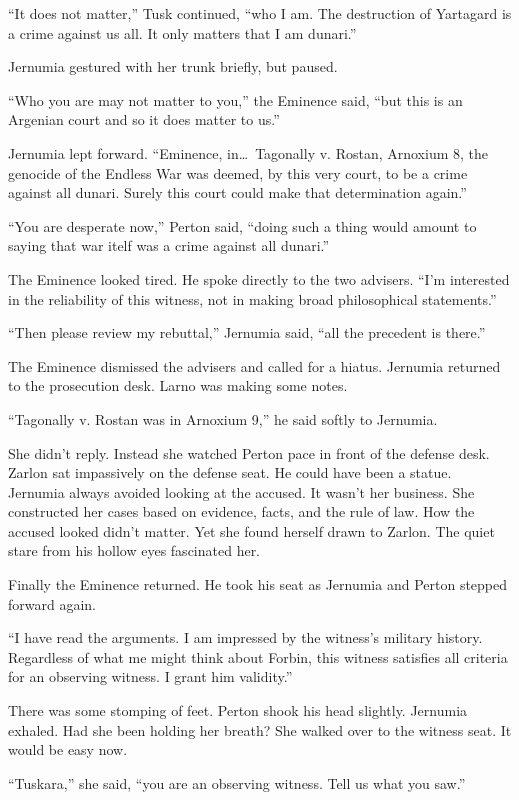 ``It does not matter,'' Tusk continued, ``who I am. The destruction of Yartagard is a crime
against us all. It only matters that I am dunari.''

Jernumia gestured with her trunk briefly, but paused.

``Who you are may not matter to you,'' the Eminence said, ``but this is an Argenian court and so
it does matter to us.''

Jernumia lept forward. ``Eminence, in\ldots\ Tagonally v. Rostan, Arnoxium 8, the genocide of
the Endless War was deemed, by this very court, to be a crime against all dunari. Surely this
court could make that determination again.''

``You are desperate now,'' Perton said, ``doing such a thing would amount to saying that war
itelf was a crime against all dunari.''

The Eminence looked tired. He spoke directly to the two advisers. ``I'm interested in the
reliability of this witness, not in making broad philosophical statements.''

``Then please review my rebuttal,'' Jernumia said, ``all the precedent is there.''

The Eminence dismissed the advisers and called for a hiatus. Jernumia returned to the
prosecution desk. Larno was making some notes.

``Tagonally v. Rostan was in Arnoxium 9,'' he said softly to Jernumia.

She didn't reply. Instead she watched Perton pace in front of the defense desk. Zarlon sat
impassively on the defense seat. He could have been a statue. Jernumia always avoided looking at
the accused. It wasn't her business. She constructed her cases based on evidence, facts, and the
rule of law. How the accused looked didn't matter. Yet she found herself drawn to Zarlon. The
quiet stare from his hollow eyes fascinated her.

Finally the Eminence returned. He took his seat as Jernumia and Perton stepped forward again.

``I have read the arguments. I am impressed by the witness's military history. Regardless of
what me might think about Forbin, this witness satisfies all criteria for an observing witness.
I grant him validity.''

There was some stomping of feet. Perton shook his head slightly. Jernumia exhaled. Had she been
holding her breath? She walked over to the witness seat. It would be easy now.

``Tuskara,'' she said, ``you are an observing witness. Tell us what you saw.''


